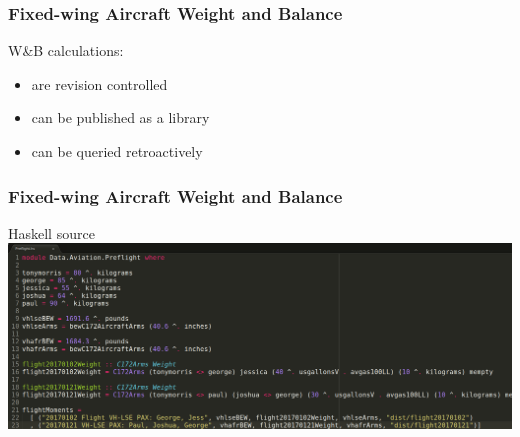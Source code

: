\begin{frame}
\frametitle{Fixed-wing Aircraft Weight and Balance}
\begin{block}{}
W\&B calculations:
\begin{itemize}
\item<1-> are revision controlled
\item<2-> can be published as a library
\item<3-> can be queried retroactively
\end{itemize}
\end{block}
\end{frame}

\begin{frame}
\frametitle{Fixed-wing Aircraft Weight and Balance}
\begin{block}{Haskell source}
\includegraphics[height=0.44\textheight]{image/preflight-source.png}
\end{block}
\end{frame}
